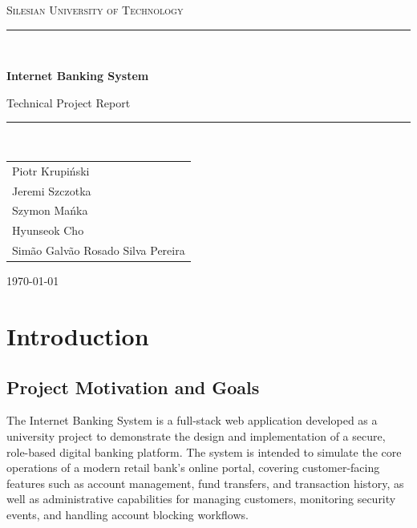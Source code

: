 \documentclass[12pt,a4paper]{report}
\begin{document}
\begin{titlepage}
  \centering
  \vspace*{2cm}
  {\Large\scshape Silesian University of Technology \par}
  \vspace{3cm}
  \rule{\linewidth}{0.5mm}\\[0.4cm]
  {\huge\bfseries Internet Banking System\par}
  \vspace{0.3cm}
  {\Large Technical Project Report\par}
  \rule{\linewidth}{0.5mm}\\[1.5cm]

  \begin{tabular}{l}
    Piotr Krupi\'nski \\[0.8em]
    Jeremi Szczotka \\[0.8em]
    Szymon Ma\'nka \\[0.8em]
    Hyunseok Cho \\[0.8em]
    Sim\~ao Galv\~ao Rosado Silva Pereira \\[0.8em]
  \end{tabular}

  \vfill
  \vspace{1cm}
  {\large \today \par}
\end{titlepage}

\tableofcontents
\listoffigures
\listoftables
\clearpage

\chapter{Introduction}

\section{Project Motivation and Goals}

The Internet Banking System is a full-stack web application developed as a university
project to demonstrate the design and implementation of a secure, role-based digital
banking platform. The system is intended to simulate the core operations of a modern
retail bank's online portal, covering customer-facing features such as account management,
fund transfers, and transaction history, as well as administrative capabilities for
managing customers, monitoring security events, and handling account blocking workflows.
\end{document}

